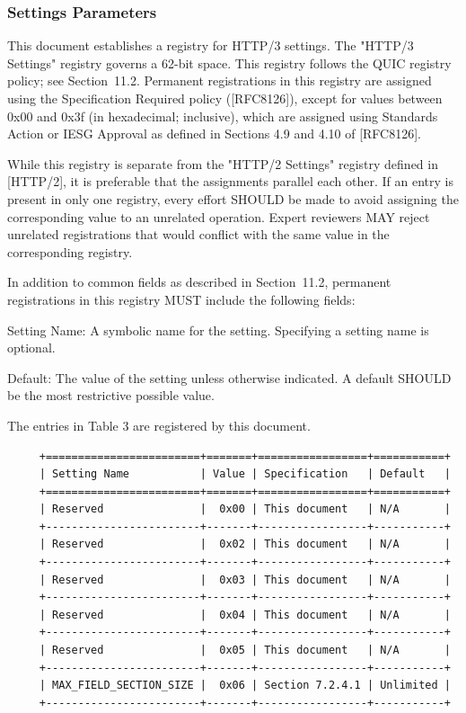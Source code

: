 \documentclass{article}
\begin{document}
\subsubsection{Settings Parameters}

This document establishes a registry for HTTP/3 settings.  The "HTTP/3 Settings" registry governs a 62-bit space.  This registry follows the QUIC registry policy; see Section~11.2.  Permanent registrations in this registry are assigned using the Specification Required policy ([RFC8126]), except for values between 0x00 and 0x3f (in hexadecimal; inclusive), which are assigned using Standards Action or IESG Approval as defined in Sections 4.9 and 4.10 of [RFC8126].

While this registry is separate from the "HTTP/2 Settings" registry defined in [HTTP/2], it is preferable that the assignments parallel each other.  If an entry is present in only one registry, every effort SHOULD be made to avoid assigning the corresponding value to an unrelated operation.  Expert reviewers MAY reject unrelated registrations that would conflict with the same value in the corresponding registry.

In addition to common fields as described in Section~11.2, permanent registrations in this registry MUST include the following fields:

Setting Name:  A symbolic name for the setting.  Specifying a setting name is optional.

Default:  The value of the setting unless otherwise indicated.  A default SHOULD be the most restrictive possible value.

The entries in Table 3 are registered by this document.

\begin{verbatim}
     +========================+=======+=================+===========+
     | Setting Name           | Value | Specification   | Default   |
     +========================+=======+=================+===========+
     | Reserved               |  0x00 | This document   | N/A       |
     +------------------------+-------+-----------------+-----------+
     | Reserved               |  0x02 | This document   | N/A       |
     +------------------------+-------+-----------------+-----------+
     | Reserved               |  0x03 | This document   | N/A       |
     +------------------------+-------+-----------------+-----------+
     | Reserved               |  0x04 | This document   | N/A       |
     +------------------------+-------+-----------------+-----------+
     | Reserved               |  0x05 | This document   | N/A       |
     +------------------------+-------+-----------------+-----------+
     | MAX_FIELD_SECTION_SIZE |  0x06 | Section 7.2.4.1 | Unlimited |
     +------------------------+-------+-----------------+-----------+
\end{verbatim}
\end{document}

